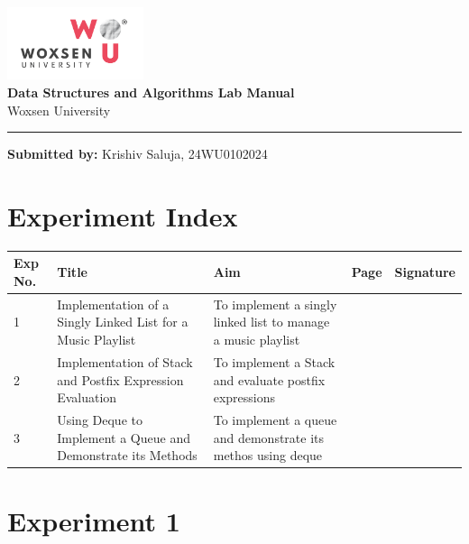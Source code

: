 \documentclass[a4paper,12pt]{article}
\begin{document}
\begin{titlepage}
    \centering
        \vspace*{2cm}
        \includegraphics[width=4cm]{woxsen_logo.png}\\[1cm]
        \Huge \textbf{Data Structures and Algorithms Lab Manual}\\[1cm]
        \Large Woxsen University\\[0.5cm]
\vspace*{\fill}
\noindent\rule{\textwidth}{1pt}
\vspace{0.5cm}
\begin{flushleft}
    \small \textbf{Submitted by:} Krishiv Saluja, 24WU0102024
\end{flushleft}
\end{titlepage}


\section*{Experiment Index}
\begin{tabular}{|p{1cm}|p{5cm}|p{5cm}|p{1cm}|p{2cm}|}
    \hline
    \textbf{Exp No.} & \textbf{Title} & \textbf{Aim} & \textbf{Page} & \textbf{Signature} \\
    \hline
    1 & Implementation of a Singly Linked List for a Music Playlist & To implement a singly linked list to manage a music playlist & \pageref{sec:exp1} & \\
    \hline
    2 & Implementation of Stack and Postfix Expression Evaluation & To implement a Stack and evaluate postfix expressions & \pageref{sec:exp2} & \\
    \hline
    3 & Using Deque to Implement a Queue and Demonstrate its Methods & To implement a queue and demonstrate its methos using deque & \pageref{sec:exp3} &\\
    \hline
\end{tabular}
\clearpage

\vspace{1cm}
\section*{ Experiment 1}
\label{sec:exp1}
\end{document}
